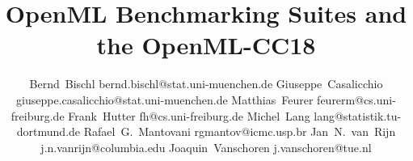\documentclass[twoside,11pt]{article}
\begin{document}
\title{OpenML Benchmarking Suites and the OpenML-CC18}
\author{\name Bernd~Bischl \email bernd.bischl@stat.uni-muenchen.de \AND 
	\name Giuseppe~Casalicchio \email giuseppe.casalicchio@stat.uni-muenchen.de \AND
    \name Matthias~Feurer \email feurerm@cs.uni-freiburg.de \AND
    \name Frank~Hutter \email fh@cs.uni-freiburg.de \AND 
    \name Michel~Lang \email lang@statistik.tu-dortmund.de \AND 
    \name Rafael~G.~Mantovani \email rgmantov@icmc.usp.br \AND 
    \name Jan~N.~van~Rijn \email j.n.vanrijn@columbia.edu \AND 
    \name Joaquin~Vanschoren \email j.vanschoren@tue.nl }
 

\maketitle              %


\end{document}
